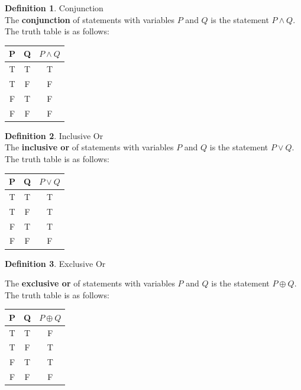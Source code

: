 \documentclass{book}
\theoremstyle{definition}
\newtheorem{definition}{Definition}[section]
\theoremstyle{remark}
\begin{document}
\begin{definition}
Conjunction \\

The {\bf conjunction} of statements with variables $P$ and $Q$ is the statement $P \wedge Q$. The truth table is as follows: \\
\begin{center}
\begin{tabular}{|c|c|c|}
\hline 
P & Q & $P \wedge Q$ \\ 
\hline 
T & T & T \\ 
\hline 
T & F & F \\ 
\hline 
F & T & F \\ 
\hline 
F & F & F \\ 
\hline 
\end{tabular} 
\end{center}
\end{definition}


\begin{definition}
Inclusive Or \\

The {\bf inclusive or} of statements with variables $P$ and $Q$ is the statement $P \vee Q$. The truth table is as follows: \\
\begin{center}
\begin{tabular}{|c|c|c|}
\hline 
P & Q & $P \vee Q$ \\ 
\hline 
T & T & T \\ 
\hline 
T & F & T \\ 
\hline 
F & T & T \\ 
\hline 
F & F & F \\ 
\hline 
\end{tabular} 
\end{center}
\end{definition}

\begin{definition}
Exclusive Or

The {\bf exclusive or} of statements with variables $P$ and $Q$ is the statement $P \oplus Q$. The truth table is as follows: \\
\begin{center}
\begin{tabular}{|c|c|c|}
\hline 
P & Q & $P \oplus Q$ \\ 
\hline 
T & T & F \\ 
\hline 
T & F & T \\ 
\hline 
F & T & T \\ 
\hline 
F & F & F \\ 
\hline 
\end{tabular} 
\end{center}
\end{definition}
\end{document}
